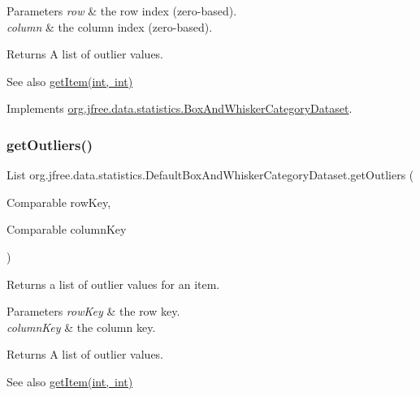 \begin{DoxyParams}{Parameters}
{\em row} & the row index (zero-\/based). \\
\hline
{\em column} & the column index (zero-\/based).\\
\hline
\end{DoxyParams}
\begin{DoxyReturn}{Returns}
A list of outlier values.
\end{DoxyReturn}
\begin{DoxySeeAlso}{See also}
\mbox{\hyperlink{classorg_1_1jfree_1_1data_1_1statistics_1_1_default_box_and_whisker_category_dataset_a85c944b06e4337059ea728b3a744e2a9}{get\+Item(int, int)}} 
\end{DoxySeeAlso}


Implements \mbox{\hyperlink{interfaceorg_1_1jfree_1_1data_1_1statistics_1_1_box_and_whisker_category_dataset_a8daae035046e9f8a98ceda14d3f5d3d5}{org.\+jfree.\+data.\+statistics.\+Box\+And\+Whisker\+Category\+Dataset}}.

\mbox{\label{classorg_1_1jfree_1_1data_1_1statistics_1_1_default_box_and_whisker_category_dataset_ac2079ef29d157fe4fc20e8659fe01741}} 
\subsubsection{\texorpdfstring{get\+Outliers()}{getOutliers()}\hspace{0.1cm}{\footnotesize\ttfamily [2/2]}}
{\footnotesize\ttfamily List org.\+jfree.\+data.\+statistics.\+Default\+Box\+And\+Whisker\+Category\+Dataset.\+get\+Outliers (\begin{DoxyParamCaption}\item[{Comparable}]{row\+Key,  }\item[{Comparable}]{column\+Key }\end{DoxyParamCaption})}

Returns a list of outlier values for an item.


\begin{DoxyParams}{Parameters}
{\em row\+Key} & the row key. \\
\hline
{\em column\+Key} & the column key.\\
\hline
\end{DoxyParams}
\begin{DoxyReturn}{Returns}
A list of outlier values.
\end{DoxyReturn}
\begin{DoxySeeAlso}{See also}
\mbox{\hyperlink{classorg_1_1jfree_1_1data_1_1statistics_1_1_default_box_and_whisker_category_dataset_a85c944b06e4337059ea728b3a744e2a9}{get\+Item(int, int)}} 
\end{DoxySeeAlso}


